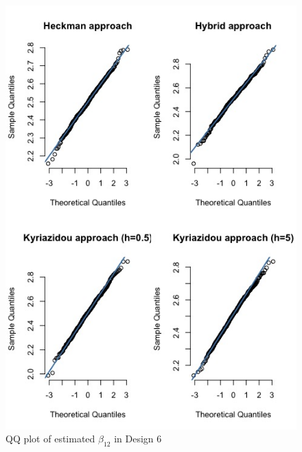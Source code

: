 \begin{figure}[htbp]
    \vspace{-2.5em}%
    \begin{adjustwidth}{-.5in}{-.5in}
        \centerline{\includegraphics[scale=.4]{content/Figures/QQ_beta_12_Design6.png}}
        \caption{\footnotesize{QQ plot of estimated $\beta_{12}$ in Design 6}}
        \label{QQ_beta_12_Design6}
    \end{adjustwidth}
\end{figure}     
